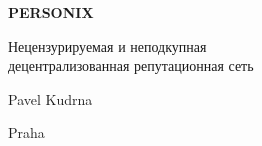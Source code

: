 \thispagestyle{empty}
\begin{center}
  {\sffamily\bfseries\fontsize{34}{40}\selectfont PERSONIX\par}
  \vspace{2.2em}
  {\rmfamily\large Нецензурируемая и неподкупная\\[0.25em]
   децентрализованная репутационная сеть\par}
\end{center}
\begin{center}
  {\rmfamily\Large Pavel Kudrna\par}
  \vspace{0.45em}
  {\rmfamily\small Praha\quad\textbullet{}\par}
\end{center}
\clearpage
